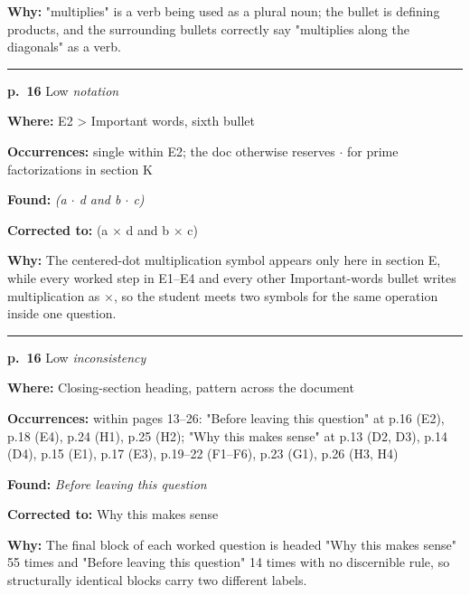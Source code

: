 \documentclass[11pt]{article}
\newcommand{\sevlow}[1]{\textcolor{black!55}{#1}}
\begin{document}
\noindent\textbf{Why: }"multiplies" is a verb being used as a plural noun; the bullet is defining products, and the surrounding bullets correctly say "multiplies along the diagonals" as a verb.\par\vspace{4pt}
\noindent\rule{\textwidth}{0.4pt}\par\nobreak\vspace{2pt}
\noindent\textbf{p.~16} \quad \sevlow{Low} \quad \textit{notation}\par
\noindent\textbf{Where: }E2 > Important words, sixth bullet\par
\noindent\textbf{Occurrences: }single within E2; the doc otherwise reserves $\cdot$ for prime factorizations in section K\par
\noindent\textbf{Found: }\textit{(a $\cdot$ d and b $\cdot$ c)}\par
\noindent\textbf{Corrected to: }(a $\times$ d and b $\times$ c)\par
\noindent\textbf{Why: }The centered-dot multiplication symbol appears only here in section E, while every worked step in E1--E4 and every other Important-words bullet writes multiplication as $\times$, so the student meets two symbols for the same operation inside one question.\par\vspace{4pt}
\noindent\rule{\textwidth}{0.4pt}\par\nobreak\vspace{2pt}
\noindent\textbf{p.~16} \quad \sevlow{Low} \quad \textit{inconsistency}\par
\noindent\textbf{Where: }Closing-section heading, pattern across the document\par
\noindent\textbf{Occurrences: }within pages 13--26: "Before leaving this question" at p.16 (E2), p.18 (E4), p.24 (H1), p.25 (H2); "Why this makes sense" at p.13 (D2, D3), p.14 (D4), p.15 (E1), p.17 (E3), p.19--22 (F1--F6), p.23 (G1), p.26 (H3, H4)\par
\noindent\textbf{Found: }\textit{Before leaving this question}\par
\noindent\textbf{Corrected to: }Why this makes sense\par
\noindent\textbf{Why: }The final block of each worked question is headed "Why this makes sense" 55 times and "Before leaving this question" 14 times with no discernible rule, so structurally identical blocks carry two different labels.\par\vspace{4pt}
\end{document}
